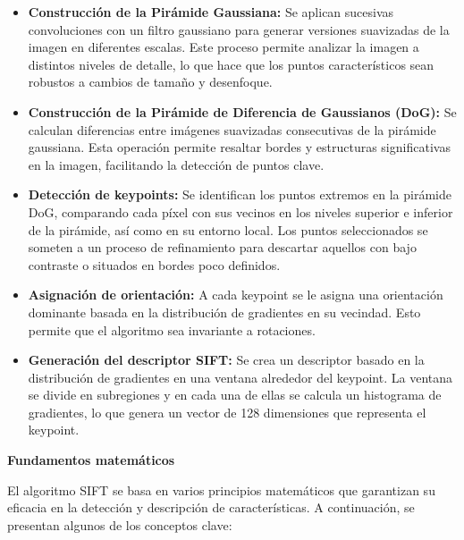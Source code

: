 \documentclass[a4paper]{article}
\begin{document}
  \begin{itemize}
      \item \textbf{Construcción de la Pirámide Gaussiana:}  
      Se aplican sucesivas convoluciones con un filtro gaussiano para generar versiones suavizadas de la imagen en diferentes escalas. Este proceso permite analizar la imagen a distintos niveles de detalle, lo que hace que los puntos característicos sean robustos a cambios de tamaño y desenfoque.
      
      \item \textbf{Construcción de la Pirámide de Diferencia de Gaussianos (DoG):}  
      Se calculan diferencias entre imágenes suavizadas consecutivas de la pirámide gaussiana. Esta operación permite resaltar bordes y estructuras significativas en la imagen, facilitando la detección de puntos clave.
      
      \item \textbf{Detección de keypoints:}  
      Se identifican los puntos extremos en la pirámide DoG, comparando cada píxel con sus vecinos en los niveles superior e inferior de la pirámide, así como en su entorno local. Los puntos seleccionados se someten a un proceso de refinamiento para descartar aquellos con bajo contraste o situados en bordes poco definidos.
      
      \item \textbf{Asignación de orientación:}  
      A cada keypoint se le asigna una orientación dominante basada en la distribución de gradientes en su vecindad. Esto permite que el algoritmo sea invariante a rotaciones.
      
      \item \textbf{Generación del descriptor SIFT:}  
      Se crea un descriptor basado en la distribución de gradientes en una ventana alrededor del keypoint. La ventana se divide en subregiones y en cada una de ellas se calcula un histograma de gradientes, lo que genera un vector de 128 dimensiones que representa el keypoint.
  \end{itemize}
  
  \par\vspace{0.5cm}
  \textbf{Fundamentos matemáticos}
  \par\vspace{0.5cm}
  
  El algoritmo SIFT se basa en varios principios matemáticos que garantizan su eficacia en la detección y descripción de características. A continuación, se presentan algunos de los conceptos clave:
  
\end{document}
